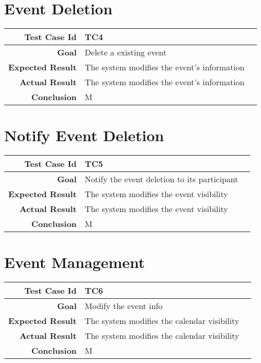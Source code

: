 \section{Event Deletion}
\begin{tabularx}{\linewidth}{|r|X|X|}

  \hline   {\bf Test Case Id} &  TC4\\
  \hline  {\bf Goal} & Delete a existing event\\
  
  \hline  {\bf Expected Result} & The system modifies the event's information\\
  \hline  {\bf Actual Result} & The system modifies the event's information\\
  \hline  {\bf Conclusion} & M\\
  \hline
  
\end{tabularx}

\section{Notify Event Deletion}
\begin{tabularx}{\linewidth}{|r|X|X|}
\hline   {\bf Test Case Id} &  TC5\\
  \hline  {\bf Goal} & Notify the event deletion to its participant\\
 
  \hline  {\bf Expected Result} & The system modifies the event visibility\\
  \hline  {\bf Actual Result} & The system modifies the event visibility\\
  \hline  {\bf Conclusion} & M\\
  \hline
  
\end{tabularx}

\section{Event Management}
\begin{tabularx}{\linewidth}{|r|X|X|}
\hline   {\bf Test Case Id} &  TC6\\
  \hline  {\bf Goal} & Modify the event info\\
   \hline  {\bf Expected Result} & The system modifies the calendar visibility\\
  \hline  {\bf Actual Result} & The system modifies the calendar visibility\\
  \hline  {\bf Conclusion} & M\\
  \hline
  
\end{tabularx}



